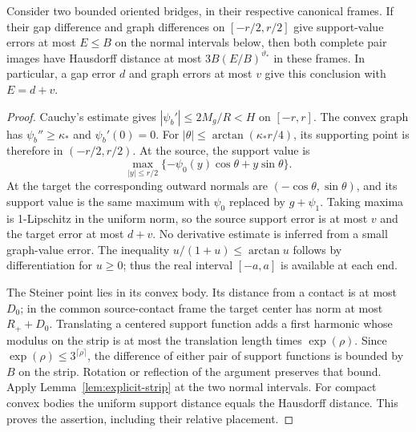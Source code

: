\begin{lemma}
\label{lem:eff-pair}
Consider two bounded oriented bridges, in their respective canonical
frames. If their gap difference and graph differences on
$[-r/2,r/2]$ give support-value errors at most $E\le B$ on the
normal intervals below, then both complete pair images have Hausdorff
distance at most $3B(E/B)^{\vartheta_*}$ in these frames.
In particular, a gap error $d$ and graph errors at most $v$ give this
conclusion with $E=d+v$.
\end{lemma}
\begin{proof}
Cauchy's estimate gives $|\psi_b'|\le2M_g/R<H$ on $[-r,r]$.
The convex graph has $\psi_b''\ge\kappa_*$ and $\psi_b'(0)=0$.
For $|\theta|\le\arctan(\kappa_*r/4)$, its supporting point is
therefore in $(-r/2,r/2)$. At the source, the support value is
\[
 \max_{|y|\le r/2}\{-\psi_0(y)\cos\theta+y\sin\theta\}.
\]
At the target the corresponding outward normals are
$(-\cos\theta,\sin\theta)$, and its support value is the same
maximum with $\psi_0$ replaced by $g+\psi_1$. Taking maxima is
1-Lipschitz in the uniform norm, so the source support error is at
most $v$ and the target error at most $d+v$. No derivative estimate
is inferred from a small graph-value error. The inequality
$u/(1+u)\le\arctan u$ follows by differentiation for $u\ge0$;
thus the real interval $[-a,a]$ is available at each end.

The Steiner point lies in its convex body. Its distance from a contact
is at most $D_0$; in the common source-contact frame the target center
has norm at most $R_++D_0$. Translating a centered support function
adds a first harmonic whose modulus on the strip is at most the
translation length times $\exp(\rho)$. Since
$\exp(\rho)\le3^{\lceil\rho\rceil}$, the difference of either pair
of support functions is bounded by $B$ on the strip. Rotation or
reflection of the argument preserves that bound. Apply
Lemma~\ref{lem:explicit-strip} at the two normal intervals. For compact
convex bodies the uniform support distance equals the Hausdorff distance.
This proves the assertion, including their relative placement.
\end{proof}

